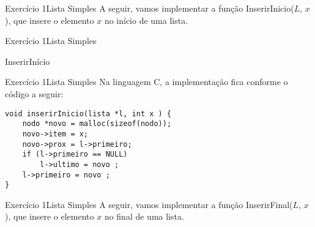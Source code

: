 \documentclass[aspectratio=169]{beamer}
\begin{document}

\begin{frame}[fragile]{Exercício 1}{Lista Simples}
A seguir, vamos implementar a função InserirInicio($L$, $x$), que insere o elemento $x$ no início de uma lista.
\end{frame}


\begin{frame}[fragile]{Exercício 1}{Lista Simples}
\begin{algorithm}[H]
\caption{InserirInício} 
\label{ListaSimplesInserirInicio}
\end{algorithm}
\end{frame}


\begin{frame}[fragile]{Exercício 1}{Lista Simples}
Na linguagem C, a implementação fica conforme o código a seguir:
\begin{lstlisting}[style=CStyle]
void inserirInicio(lista *l, int x ) {
    nodo *novo = malloc(sizeof(nodo));
    novo->item = x;
    novo->prox = l->primeiro;
    if (l->primeiro == NULL) 
        l->ultimo = novo ;
    l->primeiro = novo ;
}
\end{lstlisting}  
\end{frame}


\begin{frame}[fragile]{Exercício 1}{Lista Simples}
A seguir, vamos implementar a função InserirFinal($L$, $x$), que insere o elemento $x$ no final de uma lista.
\end{frame}
\end{document}
